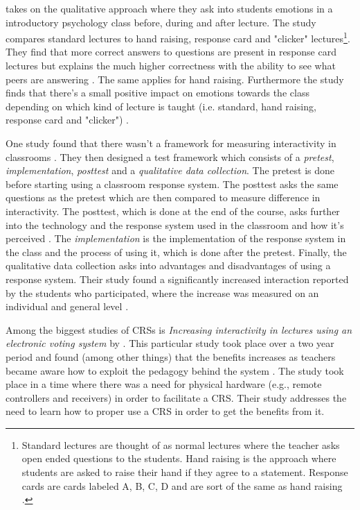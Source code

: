  takes on the qualitative approach where they ask into students emotions in a introductory psychology class before, during and after lecture. The study compares standard lectures to hand raising, response card and "clicker" lectures\footnote{Standard lectures are thought of as normal lectures where the teacher asks open ended questions to the students. Hand raising is the approach where students are asked to raise their hand if they agree to a statement. Response cards are cards labeled A, B, C, D and are sort of the same as hand raising \cite[p.~254]{stowell2007benefits}.}.
They find that more correct answers to questions are present in response card lectures but explains the much higher correctness with the ability to see what peers are answering \cite[p.~257]{stowell2007benefits}. The same applies for hand raising. Furthermore the study finds that there's a small positive impact on emotions towards the class depending on which kind of lecture is taught (i.e. standard, hand raising, response card and "clicker") \cite{stowell2007benefits}.

One study found that there wasn't a framework for measuring interactivity in classrooms \cite[p.~400]{siau2006use}. They then designed a test framework which consists of a \emph{pretest}, \emph{implementation}, \emph{posttest} and a \emph{qualitative data collection}. The pretest is done before starting using a classroom response system. The posttest asks the same questions as the pretest which are then compared to measure difference in interactivity. The posttest, which is done at the end of the course, asks further into the technology and the response system used in the classroom and how it's perceived \cite{siau2006use}. The \emph{implementation} is the implementation of the response system in the class and the process of using it, which is done after the pretest. Finally, the qualitative data collection asks into advantages and disadvantages of using a response system. Their study found a significantly increased interaction reported by the students who participated, where the increase was measured on an individual and general level \cite[p.~400]{siau2006use}.


Among the biggest studies of CRSs is \emph{Increasing interactivity in lectures using an electronic voting system} by . This particular study took place over a two year period and found (among other things) that the benefits increases as teachers became aware how to exploit the pedagogy behind the system \cite[p.~93]{draper2004increasing}. The study took place in a time where there was a need for physical hardware (e.g., remote controllers and receivers) in order to facilitate a CRS. Their study addresses the need to learn how to proper use a CRS in order to get the benefits from it.

